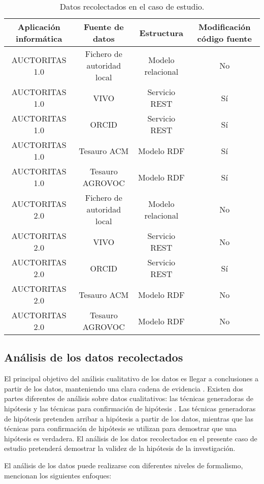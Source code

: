 \begin{table}
\centering
\begin{tabular}{c|c|c|c}
\hline 
Aplicación informática & Fuente de datos & Estructura & Modificación código fuente \\ 
\hline 
AUCTORITAS 1.0 & Fichero de autoridad local & Modelo relacional & No\\
\hline
AUCTORITAS 1.0 & VIVO & Servicio REST & Sí\\
\hline
AUCTORITAS 1.0 & ORCID & Servicio REST & Sí\\
\hline
AUCTORITAS 1.0 & Tesauro ACM & Modelo RDF & Sí\\
\hline
AUCTORITAS 1.0 & Tesauro AGROVOC & Modelo RDF & Sí\\
\hline
AUCTORITAS 2.0 & Fichero de autoridad local & Modelo relacional & No\\
\hline
AUCTORITAS 2.0 & VIVO & Servicio REST & No\\
\hline
AUCTORITAS 2.0 & ORCID & Servicio REST & Sí\\
\hline
AUCTORITAS 2.0 & Tesauro ACM & Modelo RDF & No\\
\hline
AUCTORITAS 2.0 & Tesauro AGROVOC & Modelo RDF & No\\
\hline
\end{tabular} 
\caption{Datos recolectados en el caso de estudio.}
\label{tabla: recoleccion}
\end{table}

\subsection{Análisis de los datos recolectados}
El principal objetivo del análisis cualitativo de los datos es llegar a conclusiones a partir de los datos, manteniendo una clara cadena de evidencia \citep{Wohlin2012}. Existen dos partes diferentes de análisis sobre datos cualitativos: las técnicas generadoras de hipótesis y las técnicas para confirmación de hipótesis \citep{799955}. Las técnicas generadoras de hipótesis pretenden arribar a hipótesis a partir de los datos, mientras que las técnicas para confirmación de hipótesis se utilizan para demostrar que una hipótesis es verdadera. El análisis de los datos recolectados en el presente caso de estudio pretenderá demostrar la validez de la hipótesis de la investigación.

El análisis de los datos puede realizarse con diferentes niveles de formalismo, \cite{Wohlin2012} mencionan los siguientes enfoques:

